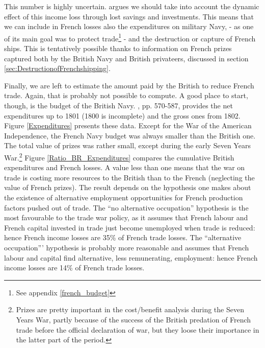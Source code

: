 \documentclass[12pt,a4paper,notitlepage,english]{article}
\begin{document}
This number is highly uncertain. \cite{Daudin2005} argues we should take into account the dynamic effect of this income loss through lost savings and investments. 
This means that we can include in French losses also the expenditures on military Navy, - as one of its main goal was to protect trade\footnote{See appendix \ref{french_budget}} - and the destruction or capture of French ships. This is tentatively possible thanks to information on French prizes captured both by the British Navy and British privateers, discussed in section \ref{sec:DestructionofFrenchshipping}.

Finally, we are left to estimate the amount paid by the British to reduce French trade. Again, that is probably not possible to compute. A good place to start, though, is the budget of the British Navy. \cite{mitchell1988}, pp. 570-587, provides the net expenditures up to 1801 (1800 is incomplete) and the gross ones from 1802.
Figure \ref{Expenditures} presents these data. Except for the War of the American Independence, the French Navy budget was always smaller than the British one. The total value of prizes was rather small, except during the early Seven Years War.\footnote{Prizes are pretty important in the cost/benefit analysis during the Seven Years War, partly because of the success of the British predation of French trade before the official declaration of war, but they loose their importance in the latter part of the period.}
Figure \ref{Ratio_BR_Expenditures} compares the cumulative British expenditures and French losses. A value less than one means that the war on trade is costing more resources to the British than to the French (neglecting the value of French prizes). 
The result depends on the hypothesis one makes about the existence of alternative employment opportunities for French production factors pushed out of trade. The ``no alternative occupation'' hypothesis is the most favourable to the trade war policy, as it assumes that French labour and French capital invested in trade just become unemployed when trade is reduced: hence French income losses are 35\% of French trade losses. The ``alternative occupation''' hypothesis is probably more reasonable and assumes that French labour and capital find alternative, less remunerating, employment: hence French income losses are 14\% of French trade losses.
\end{document}
